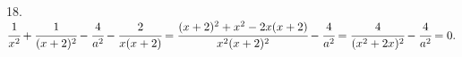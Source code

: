 18. $\cfrac{1}{x^2}+\cfrac{1}{(x+2)^2}-\cfrac{4}{a^2}-\cfrac{2}{x(x+2)}=
\cfrac{(x+2)^2+x^2-2x(x+2)}{x^2(x+2)^2}-\cfrac{4}{a^2}=
\cfrac{4}{(x^2+2x)^2}-\cfrac{4}{a^2}=0.$\\
